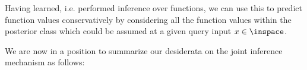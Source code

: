 Having learned, i.e. performed inference over functions, we can use this to predict function values conservatively by considering all the function values within the posterior class which could be assumed at a given query input $x \in \inspace$.

We are now in a position to summarize our desiderata on the joint inference mechanism as follows:



